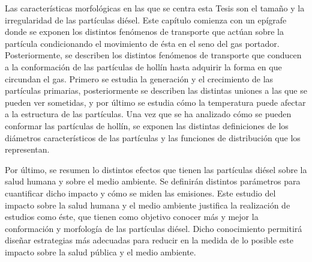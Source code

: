 \par Las características morfológicas en las que se centra esta Tesis son el tamaño y la irregularidad de las partículas diésel. Este capítulo comienza con un epígrafe donde se exponen los distintos fenómenos de transporte que actúan sobre la partícula condicionando el movimiento de ésta en el seno del gas portador. Posteriormente, se describen los distintos fenómenos de transporte que conducen a la conformación de las partículas de hollín hasta adquirir la forma en que circundan el gas. Primero se estudia la generación y el crecimiento de las partículas primarias, posteriormente se describen las distintas uniones a las que se pueden ver sometidas, y por último se estudia cómo la temperatura puede afectar a la estructura de las partículas. Una vez que se ha analizado cómo se pueden conformar las partículas de hollín, se exponen las distintas definiciones de los diámetros característicos de las partículas y las funciones de distribución que los representan.

\par Por último, se resumen lo distintos efectos que tienen las partículas diésel sobre la salud humana y sobre el medio ambiente. Se definirán distintos parámetros para cuantificar dicho impacto y cómo se miden las emisiones. Este estudio del impacto sobre la salud humana y el medio ambiente justifica la realización de estudios como éste, que tienen como objetivo conocer más y mejor la conformación y morfología de las partículas diésel. Dicho conocimiento permitirá diseñar estrategias más adecuadas para reducir en la medida de lo posible este impacto sobre la salud pública y el medio ambiente.

